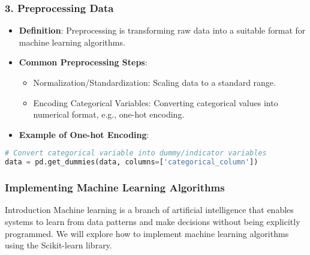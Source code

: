 \documentclass{beamer}
\begin{document}
\begin{frame}[fragile]
    \frametitle{3. Preprocessing Data}
    \begin{itemize}
        \item \textbf{Definition}: Preprocessing is transforming raw data into a suitable format for machine learning algorithms.
        \item \textbf{Common Preprocessing Steps}:
        \begin{itemize}
            \item Normalization/Standardization: Scaling data to a standard range.
            \item Encoding Categorical Variables: Converting categorical values into numerical format, e.g., one-hot encoding.
        \end{itemize}
        \item \textbf{Example of One-hot Encoding}:
    \end{itemize}
    \begin{lstlisting}[language=Python]
# Convert categorical variable into dummy/indicator variables
data = pd.get_dummies(data, columns=['categorical_column'])
    \end{lstlisting}
\end{frame}

\begin{frame}
    \frametitle{Implementing Machine Learning Algorithms}
    \begin{block}{Introduction}
        Machine learning is a branch of artificial intelligence that enables systems to learn from data patterns and make decisions without being explicitly programmed.
        We will explore how to implement machine learning algorithms using the Scikit-learn library.
    \end{block}
\end{frame}
\end{document}
